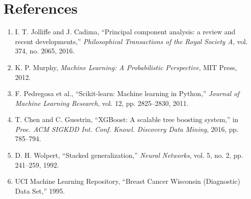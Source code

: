 \documentclass[12pt,a4paper]{article}
\begin{document}
\section{References}
\begin{enumerate}
    \item I. T. Jolliffe and J. Cadima, ``Principal component analysis: a review and recent developments,'' \textit{Philosophical Transactions of the Royal Society A}, vol. 374, no. 2065, 2016.
    \item K. P. Murphy, \textit{Machine Learning: A Probabilistic Perspective}, MIT Press, 2012.
    \item F. Pedregosa et al., ``Scikit-learn: Machine learning in Python,'' \textit{Journal of Machine Learning Research}, vol. 12, pp. 2825--2830, 2011.
    \item T. Chen and C. Guestrin, ``XGBoost: A scalable tree boosting system,'' in \textit{Proc. ACM SIGKDD Int. Conf. Knowl. Discovery Data Mining}, 2016, pp. 785--794.
    \item D. H. Wolpert, ``Stacked generalization,'' \textit{Neural Networks}, vol. 5, no. 2, pp. 241--259, 1992.
    \item UCI Machine Learning Repository, ``Breast Cancer Wisconsin (Diagnostic) Data Set,'' 1995.
\end{enumerate}
\end{document}
